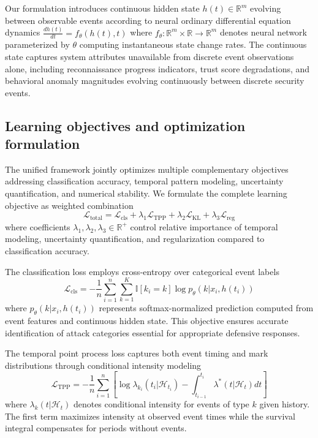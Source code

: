 \documentclass[10pt,journal,compsoc]{IEEEtran}
\newcommand{\R}{\mathbb{R}}
\begin{document}
Our formulation introduces continuous hidden state $h(t) \in \R^m$ evolving between observable events according to neural ordinary differential equation dynamics $\frac{dh(t)}{dt} = f_\theta(h(t), t)$ where $f_\theta: \R^m \times \R \to \R^m$ denotes neural network parameterized by $\theta$ computing instantaneous state change rates. The continuous state captures system attributes unavailable from discrete event observations alone, including reconnaissance progress indicators, trust score degradations, and behavioral anomaly magnitudes evolving continuously between discrete security events.

\subsection{Learning objectives and optimization formulation}

The unified framework jointly optimizes multiple complementary objectives addressing classification accuracy, temporal pattern modeling, uncertainty quantification, and numerical stability. We formulate the complete learning objective as weighted combination
\begin{equation}
\mathcal{L}_{\text{total}} = \mathcal{L}_{\text{cls}} + \lambda_1 \mathcal{L}_{\text{TPP}} + \lambda_2 \mathcal{L}_{\text{KL}} + \lambda_3 \mathcal{L}_{\text{reg}}
\label{eq:total_loss}
\end{equation}
where coefficients $\lambda_1, \lambda_2, \lambda_3 \in \R^+$ control relative importance of temporal modeling, uncertainty quantification, and regularization compared to classification accuracy.

The classification loss employs cross-entropy over categorical event labels
\begin{equation}
\mathcal{L}_{\text{cls}} = -\frac{1}{n}\sum_{i=1}^n \sum_{k=1}^K \mathbb{I}[k_i = k] \log p_\theta(k | x_i, h(t_i))
\end{equation}
where $p_\theta(k | x_i, h(t_i))$ represents softmax-normalized prediction computed from event features and continuous hidden state. This objective ensures accurate identification of attack categories essential for appropriate defensive responses.

The temporal point process loss captures both event timing and mark distributions through conditional intensity modeling
\begin{equation}
\mathcal{L}_{\text{TPP}} = -\frac{1}{n}\sum_{i=1}^n \left[ \log \lambda_{k_i}(t_i | \mathcal{H}_{t_i}) - \int_{t_{i-1}}^{t_i} \lambda^*(t | \mathcal{H}_t) dt \right]
\end{equation}
where $\lambda_{k}(t | \mathcal{H}_t)$ denotes conditional intensity for events of type $k$ given history. The first term maximizes intensity at observed event times while the survival integral compensates for periods without events.
\end{document}
